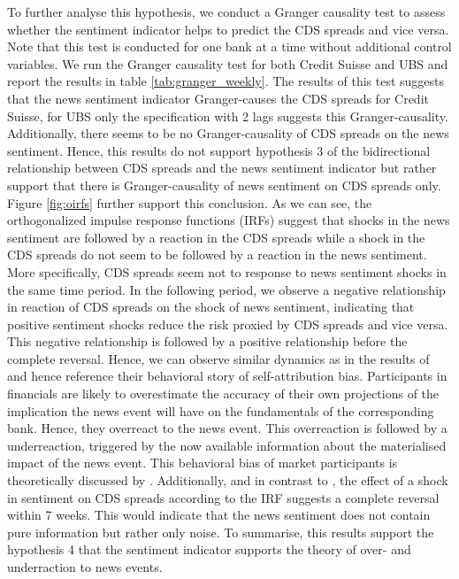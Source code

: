 To further analyse this hypothesis, we conduct a Granger causality test to assess whether the sentiment indicator helps to predict the CDS spreads and vice versa. Note that this test is conducted for one bank at a time without additional control variables. We run the Granger causality test for both Credit Suisse and UBS and report the results in table \ref{tab:granger_weekly}. The results of this test suggests that the news sentiment indicator Granger-causes the CDS spreads for Credit Suisse, for UBS only the specification with 2 lags suggests this Granger-causality. Additionally, there seems to be no Granger-causality of CDS spreads on the news sentiment. Hence, this results do not support hypothesis 3 of the bidirectional relationship between CDS spreads and the news sentiment indicator but rather support that there is Granger-causality of news sentiment on CDS spreads only. \\



Figure \ref{fig:oirfs} further support this conclusion. As we can see, the orthogonalized impulse response functions (IRFs) suggest that shocks in the news sentiment are followed by a reaction in the CDS spreads while a shock in the CDS spreads do not seem to be followed by a reaction in the news sentiment. More specifically, CDS spreads seem not to response to news sentiment shocks in the same time period. In the following period, we observe a negative relationship in reaction of CDS spreads on the shock of news sentiment, indicating that positive sentiment shocks reduce the risk proxied by CDS spreads and vice versa. This negative relationship is followed by a positive relationship before the complete reversal. Hence, we can observe similar dynamics as in the results of \cite{cathcart2020} and hence reference their behavioral story of self-attribution bias. Participants in financials are likely to overestimate the accuracy of their own projections of the implication the news event will have on the fundamentals of the corresponding bank. Hence, they overreact to the news event. This overreaction is followed by a underreaction, triggered by the now available information about the materialised impact of the news event. This behavioral bias of market participants is theoretically discussed by \cite{daniel1998}. Additionally, and in contrast to \cite{cathcart2020}, the effect of a shock in sentiment on CDS spreads according to the IRF suggests a complete reversal within 7 weeks. This would indicate that the news sentiment does not contain pure information but rather only noise. To summarise, this results support the hypothesis 4 that the sentiment indicator supports the theory of over- and underraction to news events. \\

